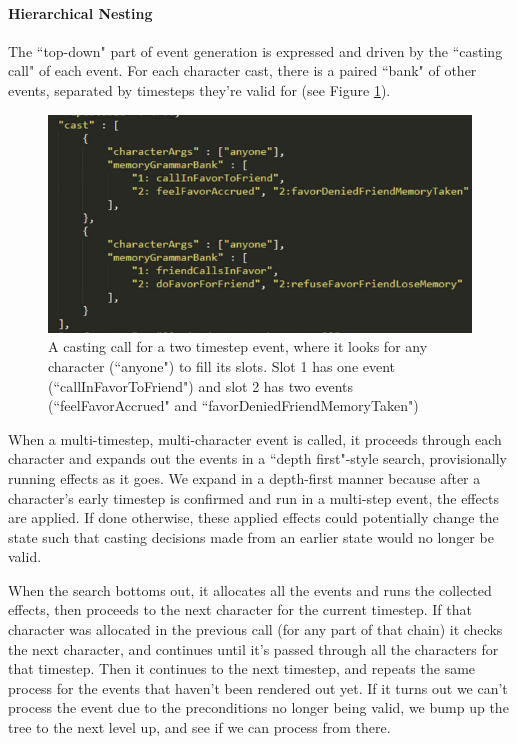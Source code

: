 \paragraph{Hierarchical Nesting}\label{par:hierarchical-nesting}

The ``top-down" part of event generation is expressed and driven by the ``casting call" of each event. For each character cast, there is a paired ``bank" of other events, separated by timesteps they're valid for (see Figure \ref{fig:delve-casting-call}).


\begin{figure}
    \centering
    \includegraphics[width=\textwidth]{figures/4-Delve/delve-data-casting-call.png}
    \caption{A casting call for a two timestep event, where it looks for any character (``anyone") to fill its slots. Slot 1 has one event (``callInFavorToFriend") and slot 2 has two events (``feelFavorAccrued" and ``favorDeniedFriendMemoryTaken")}
    \label{fig:delve-casting-call}
\end{figure}


When a multi-timestep, multi-character event is called, it proceeds through each character and expands out the events in a ``depth first"-style search, provisionally running effects as it goes. We expand in a depth-first manner because after a character’s early timestep is confirmed and run in a multi-step event, the effects are applied. If done otherwise, these applied effects could potentially change the state such that casting decisions made from an earlier state would no longer be valid. 

When the search bottoms out, it allocates all the events and runs the collected effects, then proceeds to the next character for the current timestep. If that character was allocated in the previous call (for any part of that chain) it checks the next character, and continues until it's passed through all the characters for that timestep. Then it continues to the next timestep, and repeats the same process for the events that haven’t been rendered out yet. If it turns out we can’t process the event due to the preconditions no longer being valid, we bump up the tree to the next level up, and see if we can process from there.

